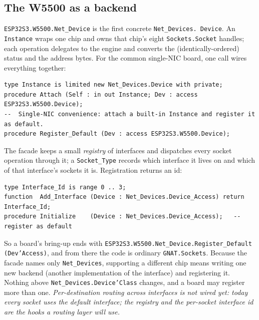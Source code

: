 \subsection{The W5500 as a backend}

\texttt{ESP32S3.W5500.Net\_Device} is the first concrete \texttt{Net\_Devices.%
Device}. An \texttt{Instance} wraps one chip and owns that chip's eight
\texttt{Sockets.Socket} handles; each operation delegates to the engine and
converts the (identically-ordered) status and the address bytes. For the common
single-NIC board, one call wires everything together:

\begin{lstlisting}
type Instance is limited new Net_Devices.Device with private;
procedure Attach (Self : in out Instance; Dev : access ESP32S3.W5500.Device);
--  Single-NIC convenience: attach a built-in Instance and register it as default.
procedure Register_Default (Dev : access ESP32S3.W5500.Device);
\end{lstlisting}

The facade keeps a small \emph{registry} of interfaces and dispatches every socket
operation through it; a \texttt{Socket\_Type} records which interface it lives on
and which of that interface's sockets it is. Registration returns an id:

\begin{lstlisting}
type Interface_Id is range 0 .. 3;
function  Add_Interface (Device : Net_Devices.Device_Access) return Interface_Id;
procedure Initialize    (Device : Net_Devices.Device_Access);   --  register as default
\end{lstlisting}

So a board's bring-up ends with \texttt{ESP32S3.W5500.Net\_Device.Register\_Default
(Dev'Access)}, and from there the code is ordinary \texttt{GNAT.Sockets}. Because
the facade names only \texttt{Net\_Devices}, supporting a different chip means
writing one new backend (another implementation of the interface) and registering
it. Nothing above \texttt{Net\_Devices.Device'Class} changes, and a board may
register more than one. \emph{Per-destination routing across interfaces is not
wired yet: today every socket uses the default interface; the registry and the
per-socket interface id are the hooks a routing layer will use.}


